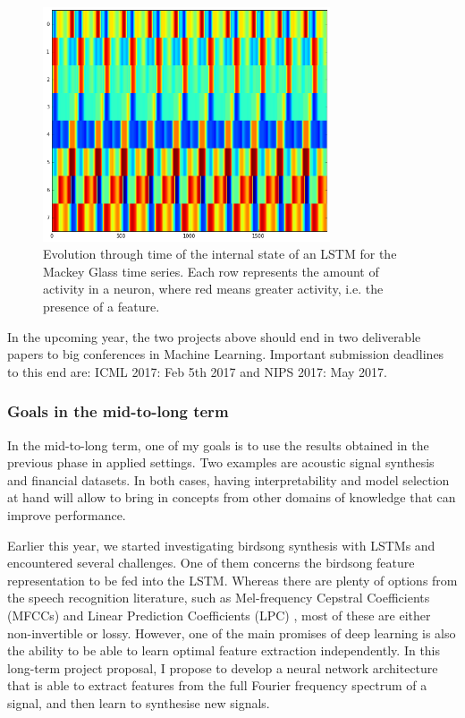 \documentclass[pdftex,12pt,a4paper]{article}
\theoremstyle{definition}
\theoremstyle{remark}
\begin{document}
\begin{figure}[t]
    \centering
    \includegraphics[width=8.5cm]{figs/inter.png}
    \caption{Evolution through time of the internal state of an LSTM for the Mackey Glass time series. Each row represents the amount of activity in a neuron, where red means greater activity, i.e. the presence of a feature. }
    \label{fig:inter} 
\end{figure} 

\par In the upcoming year, the two projects above should end in two deliverable papers to big conferences in Machine Learning. Important submission deadlines to this end are: ICML 2017: Feb 5th 2017 and NIPS 2017: May 2017.

\subsubsection{Goals in the mid-to-long term}
In the mid-to-long term, one of my goals is to use the results obtained in the previous phase in applied settings. Two examples are acoustic signal synthesis and financial datasets. In both cases, having interpretability and model selection at hand will allow to bring in concepts from other domains of knowledge that can improve performance.

\par Earlier this year, we started investigating birdsong synthesis with LSTMs and encountered several challenges. One of them concerns the birdsong feature representation to be fed into the LSTM. Whereas there are plenty of options from the speech recognition literature, such as Mel-frequency Cepstral Coefficients (MFCCs) and Linear Prediction Coefficients (LPC) \cite{Jurafsky2009}, most of these are either non-invertible or lossy. However, one of the main promises of deep learning is also the ability to be able to learn optimal feature extraction independently. In this long-term project proposal, I propose to develop a neural network architecture that is able to extract features from the full Fourier frequency spectrum of a signal, and then learn to synthesise new signals. 
\end{document}
